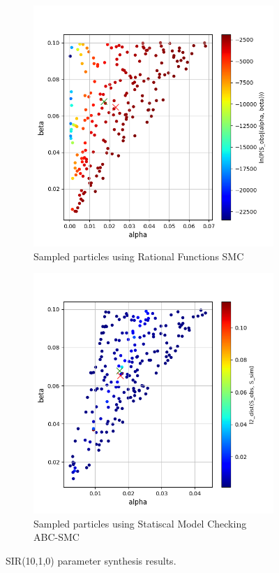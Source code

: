 \begin{figure}[H]
    \centering
    \begin{subfigure}{0.48\textwidth}
        \centering
        \includegraphics[width=\linewidth]{figures/sir510_rfsmc.png}
        \caption{Sampled particles using Rational Functions SMC}
    \end{subfigure}
    \hfill
    \begin{subfigure}{0.48\textwidth}
        \centering
        \includegraphics[width=\linewidth]{figures/sir510_abcsmc.png}
        \caption{Sampled particles using Statiscal Model Checking ABC-SMC}
    \end{subfigure}
    \caption{SIR(10,1,0) parameter synthesis results.}
\end{figure}

